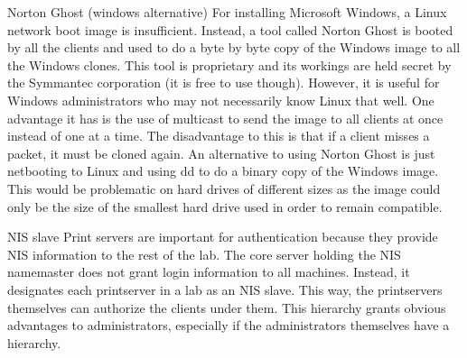Norton Ghost (windows alternative)
For installing Microsoft Windows, a Linux network boot image is insufficient.  Instead, a tool called Norton Ghost is booted by all the clients and used to do a byte by byte copy of the Windows image to all the Windows clones.  This tool is proprietary and its workings are held secret by the Symmantec corporation (it is free to use though).  However, it is useful for Windows administrators who may not necessarily know Linux that well.  One advantage it has is the use of multicast to send the image to all clients at once instead of one at a time.  The disadvantage to this is that if a client misses a packet, it must be cloned again.  An alternative to using Norton Ghost is just netbooting to Linux and using dd to do a binary copy of the Windows image.  This would be problematic on hard drives of different sizes as the image could only be the size of the smallest hard drive used in order to remain compatible.  

NIS slave
Print servers are important for authentication because they provide NIS information to the rest of the lab.  The core server holding the NIS namemaster does not grant login information to all machines.  Instead, it designates each printserver in a lab as an NIS slave.  This way, the printservers themselves can authorize the clients under them.  This hierarchy grants obvious advantages to administrators, especially if the administrators themselves have a hierarchy.  
